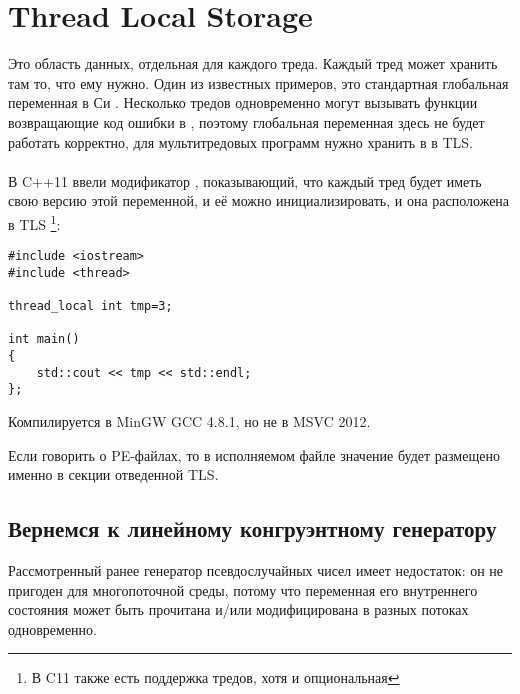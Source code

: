 \section{Thread Local Storage}
\label{TLS}

Это область данных, отдельная для каждого треда. Каждый тред может хранить там то, что ему нужно.
Один из известных примеров, это стандартная глобальная переменная в Си . 
Несколько тредов одновременно могут вызывать функции возвращающие код ошибки в , поэтому глобальная переменная здесь не будет работать корректно, 
для мультитредовых программ  нужно хранить в в \ac{TLS}. \\
\\
В C++11 ввели модификатор , показывающий, что каждый тред будет иметь свою версию этой переменной, и её можно инициализировать, и она расположена в \ac{TLS}
\footnote{ В C11 также есть поддержка тредов, хотя и опциональная}:

\begin{lstlisting}[caption=C++11]
#include <iostream>
#include <thread>

thread_local int tmp=3;

int main()
{
	std::cout << tmp << std::endl;
};
\end{lstlisting}

Компилируется в MinGW GCC 4.8.1, но не в MSVC 2012.

Если говорить о PE-файлах, то в исполняемом файле значение  будет размещено именно в секции отведенной \ac{TLS}.

\subsection{Вернемся к линейному конгруэнтному генератору}
\label{LCG_TLS}

Рассмотренный ранее  генератор псевдослучайных чисел имеет недостаток:
он не пригоден для многопоточной среды, потому что переменная его внутреннего состояния может быть
прочитана и/или модифицирована в разных потоках одновременно.





